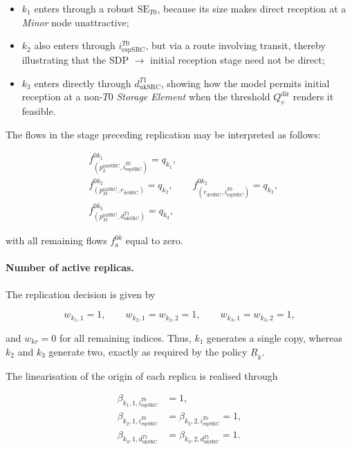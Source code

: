 \documentclass[a4paper,fleqn]{cas-dc}
\begin{document}
\begin{itemize} \item \(k_1\) enters through a robust \(\mathrm{SE}_{T0}\), because its size makes direct reception at a \emph{Minor} node unattractive; 

\item \(k_2\) also enters through \(i_{\mathrm{espSRC}}^{T0}\), but via a route involving transit, thereby illustrating that the SDP \(\to\) initial reception stage need not be direct;

\item \(k_3\) enters directly through \(d_{\mathrm{ukSRC}}^{T1}\), showing how the model permits initial reception at a non-\(T0\) \emph{Storage Element} when the threshold \(Q_v^{\mathrm{dir}}\) renders it feasible. 

\end{itemize}


The flows in the stage preceding replication may be interpreted as follows:

\begin{align*}
&f_{(p_L^{\mathrm{ausSRC}},i_{\mathrm{espSRC}}^{T0})}^{0k_1}=q_{k_1},\\
&f_{(p_M^{\mathrm{zaSRC}},r_{\mathrm{deSRC}})}^{0k_2}=q_{k_2},
\qquad
f_{(r_{\mathrm{deSRC}},i_{\mathrm{espSRC}}^{T0})}^{0k_2}=q_{k_2},\\
&f_{(p_M^{\mathrm{zaSRC}},d_{\mathrm{ukSRC}}^{T1})}^{0k_3}=q_{k_3},
\end{align*}


with all remaining flows \(f_a^{0k}\) equal to zero.

\paragraph{Number of active replicas.} 

The replication decision is given by

\[
w_{k_1,1}=1,
\qquad
w_{k_2,1}=w_{k_2,2}=1,
\qquad
w_{k_3,1}=w_{k_3,2}=1,
\]

and \(w_{kr}=0\) for all remaining indices. Thus, \(k_1\) generates a single copy, whereas \(k_2\) and \(k_3\) generate two, exactly as required by the policy \(\underline R_k\).

The linearisation of the origin of each replica is realised through

\begin{align*}
\beta_{k_1,1,i_{\mathrm{espSRC}}^{T0}} &= 1, \\[1ex]
\beta_{k_2,1,i_{\mathrm{espSRC}}^{T0}} &= \beta_{k_2,2,i_{\mathrm{espSRC}}^{T0}} = 1, \\[1ex]
\beta_{k_3,1,d_{\mathrm{ukSRC}}^{T1}} &= \beta_{k_3,2,d_{\mathrm{ukSRC}}^{T1}} = 1.
\end{align*}
\end{document}
